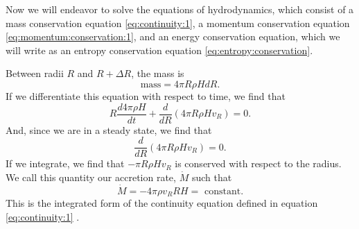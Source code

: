 \documentclass[]{article}
\newcommand{\diff}[2]{\frac{d #1}{d #2}}
\newcommand{\dR}[1]{\frac{d #1}{dR}}
\newcommand{\ddR}{\frac{d}{dR}}
\begin{document}
Now we will endeavor to solve the equations of hydrodynamics, which
consist of a mass conservation equation \eqref{eq:continuity:1}, a
momentum conservation equation \eqref{eq:momentum:conservation:1}, and
an energy conservation equation, which we will write as an entropy
conservation equation \eqref{eq:entropy:conservation}.

Between radii $R$ and $R+\Delta R$, the mass is \cite{Melia}
\begin{equation}
  \label{eq:mass}
  \text{mass} = 4 \pi R \rho H dR.
\end{equation}
If we differentiate this equation with respect to time, we find that
\cite{Melia}
\begin{equation}
  \label{eq:continuity:2}
  R \diff{4\pi\rho H}{t} + \ddR\left(4\pi R\rho H v_R\right) = 0.
\end{equation}
And, since we are in a steady state, we find that
\begin{equation}
  \label{eq:continuity:3}
  \ddR\left(4\pi R\rho H v_R\right) = 0.
\end{equation}
If we integrate, we find that $-\pi R\rho H v_R$ is conserved with
respect to the radius. We call this quantity our accretion rate,
$\dot{M}$ such that
\begin{equation}
  \label{eq:continuity:final}
  \dot{M} = -4\pi \rho v_R R H = \text{ constant.}
\end{equation}
This is the integrated form of the continuity equation defined in
equation \eqref{eq:continuity:1} \cite{Shafee08,Melia}.

\end{document}
